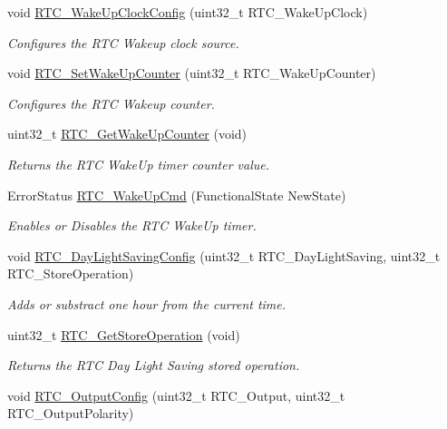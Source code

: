 \begin{DoxyCompactItemize}
void \hyperlink{group___r_t_c_ga2557b02b318211112731a91a190c4b26}{R\-T\-C\-\_\-\-Wake\-Up\-Clock\-Config} (uint32\-\_\-t R\-T\-C\-\_\-\-Wake\-Up\-Clock)
\begin{DoxyCompactList}\small\item\em Configures the R\-T\-C Wakeup clock source. \end{DoxyCompactList}\item 
void \hyperlink{group___r_t_c_ga1412044eb756a166c1cf341f3d46ed6b}{R\-T\-C\-\_\-\-Set\-Wake\-Up\-Counter} (uint32\-\_\-t R\-T\-C\-\_\-\-Wake\-Up\-Counter)
\begin{DoxyCompactList}\small\item\em Configures the R\-T\-C Wakeup counter. \end{DoxyCompactList}\item 
uint32\-\_\-t \hyperlink{group___r_t_c_gae63aab672e917cc48e298162c3dec049}{R\-T\-C\-\_\-\-Get\-Wake\-Up\-Counter} (void)
\begin{DoxyCompactList}\small\item\em Returns the R\-T\-C Wake\-Up timer counter value. \end{DoxyCompactList}\item 
Error\-Status \hyperlink{group___r_t_c_ga2ce05293303e0d7879c6d755c5355b4c}{R\-T\-C\-\_\-\-Wake\-Up\-Cmd} (Functional\-State New\-State)
\begin{DoxyCompactList}\small\item\em Enables or Disables the R\-T\-C Wake\-Up timer. \end{DoxyCompactList}\item 
void \hyperlink{group___r_t_c_ga812feddea77990b5dc336a4989ae61b8}{R\-T\-C\-\_\-\-Day\-Light\-Saving\-Config} (uint32\-\_\-t R\-T\-C\-\_\-\-Day\-Light\-Saving, uint32\-\_\-t R\-T\-C\-\_\-\-Store\-Operation)
\begin{DoxyCompactList}\small\item\em Adds or substract one hour from the current time. \end{DoxyCompactList}\item 
uint32\-\_\-t \hyperlink{group___r_t_c_gaba0c1361790203e9dca43846f0d9bc15}{R\-T\-C\-\_\-\-Get\-Store\-Operation} (void)
\begin{DoxyCompactList}\small\item\em Returns the R\-T\-C Day Light Saving stored operation. \end{DoxyCompactList}\item 
void \hyperlink{group___r_t_c_gae3165ef19ef3bd63789e59130ad8d89b}{R\-T\-C\-\_\-\-Output\-Config} (uint32\-\_\-t R\-T\-C\-\_\-\-Output, uint32\-\_\-t R\-T\-C\-\_\-\-Output\-Polarity)

\end{DoxyCompactItemize}

